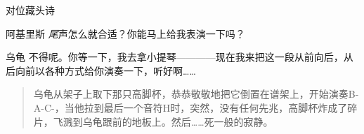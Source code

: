 \begin{dialog}{对位藏头诗}
\begin{dialogue}
\item[阿基里斯]\emph{尾}声怎么就合适？你能马上给我表演一下吗？

\item[乌龟]不得呢。你等一下，我去拿小提琴————现在我来把这一段从前向后，从后向前以各种方式给你演奏一下，听好啊……

\bigskip

\begin{quote}
乌龟从架子上取下那只高脚杯，恭恭敬敬地把它倒置在谱架上，开始演奏B-A-C-，当他拉到最后一个音符H时，突然，没有任何先兆，高脚杯炸成了碎片，飞溅到乌龟跟前的地板上。然后……死一般的寂静。
\end{quote}

\end{dialogue}

\end{dialog}
